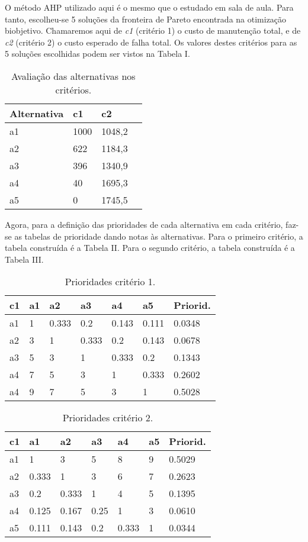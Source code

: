 O método AHP utilizado aqui é o mesmo que o estudado em sala de aula. Para tanto, escolheu-se 5 soluções da fronteira de Pareto encontrada na otimização biobjetivo. Chamaremos aqui de \textit{c1} (critério 1) o custo de manutenção total, e de \textit{c2} (critério 2) o custo esperado de falha total. Os valores destes critérios para as 5 soluções escolhidas podem ser vistos na Tabela I.
\begin{table}[h]
	\centering
	\begin{tabular}{ | l | l | l | l |}
		\hline
		Alternativa & c1 & c2 \\ \hline
		a1 & 1000 & 1048,2 \\ \hline
		a2 & 622 & 1184,3 \\ \hline
		a3 & 396 & 1340,9 \\ \hline
		a4 & 40 & 1695,3 \\ \hline
		a5 & 0 & 1745,5 \\ \hline
	\end{tabular}
	\label{table:c-ahp}
	\caption{Avaliação das alternativas nos critérios.}
\end{table}

\newpage

Agora, para a definição das prioridades de cada alternativa em cada critério, faz-se as tabelas de prioridade dando notas às alternativas. Para o primeiro critério, a tabela construída é a Tabela II. Para o segundo critério, a tabela construída é a Tabela III.
\begin{table}[h]
	\centering
	\begin{tabular}{ | l | l | l | l | l | l | l | }
		\hline
		c1 & a1 & a2 & a3 & a4 & a5 & Priorid. \\ \hline
		a1 & 1 & 0.333 & 0.2 & 0.143 & 0.111 & 0.0348 \\ \hline
		a2 & 3 & 1 & 0.333 & 0.2 & 0.143 & 0.0678 \\ \hline
		a3 & 5 & 3 & 1 & 0.333 & 0.2 & 0.1343 \\ \hline
		a4 & 7 & 5 & 3 & 1 & 0.333 & 0.2602 \\ \hline
		a4 & 9 & 7 & 5 & 3 & 1 & 0.5028 \\ \hline
	\end{tabular}
	\label{table:c1}
	\caption{Prioridades critério 1.}
\end{table}

\begin{table}[h]
	\centering
	\begin{tabular}{ | l | l | l | l | l | l | l | }
		\hline
		c1 & a1 & a2 & a3 & a4 & a5 & Priorid. \\ \hline
		a1 & 1 & 3 & 5 & 8 & 9 & 0.5029 \\ \hline
		a2 & 0.333 & 1 & 3 & 6 & 7 & 0.2623 \\ \hline
		a3 & 0.2 & 0.333 & 1 & 4 & 5 & 0.1395 \\ \hline
		a4 & 0.125 & 0.167 & 0.25 & 1 & 3 & 0.0610 \\ \hline
		a5 & 0.111 & 0.143 & 0.2 & 0.333 & 1 & 0.0344 \\ \hline
	\end{tabular}
	\label{table:c2}
	\caption{Prioridades critério 2.}
\end{table}


